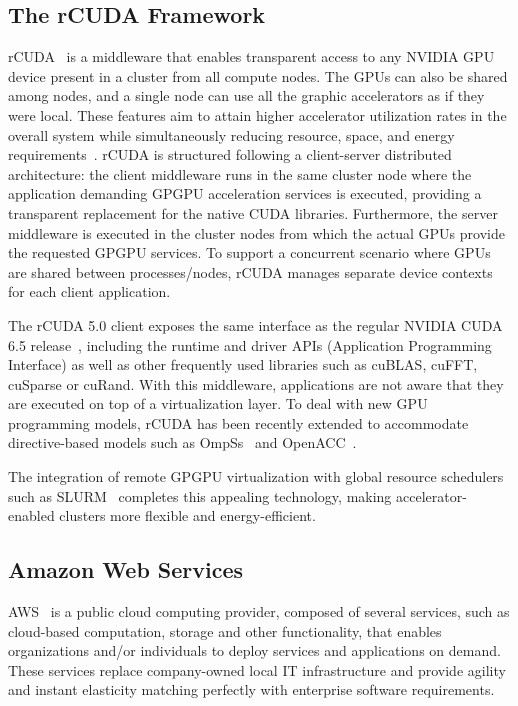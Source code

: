 \documentclass[a4paper,twoside]{article}
\begin{document}
\subsection{The rCUDA Framework}
\label{sec:rcuda}
{rCUDA}~\cite{toniparco} is a middleware that enables transparent access
to any NVIDIA GPU device present in a cluster from all compute
nodes. The GPUs can also be shared among nodes, and a single node can use all the graphic accelerators
as if they were local.
These features aim to attain higher accelerator utilization rates in the overall system while simultaneously reducing
resource, space, and energy requirements~\cite{energy14}.
rCUDA is structured following a client-server distributed
architecture: the client middleware runs in the same cluster node where the application demanding GPGPU
acceleration services is executed, providing a transparent replacement for the
native CUDA libraries. Furthermore, the server middleware is executed in the
cluster nodes from which the actual GPUs provide the requested GPGPU services.
To support a concurrent scenario where GPUs are shared between
processes\slash nodes, {rCUDA} manages separate device contexts for
each client application.

The {rCUDA} 5.0 client exposes the same interface as the regular NVIDIA
CUDA 6.5 release~\cite{cuda65}, including the runtime and driver
APIs (Application Programming Interface) as well as other frequently used libraries such as cuBLAS, cuFFT, cuSparse or cuRand.
With this middleware, applications are not aware that they are executed
on top of a virtualization layer.
To deal with new GPU programming models, {rCUDA} has been recently extended to accommodate 
directive-based models such as OmpSs~\cite{repara15} and OpenACC~\cite{cluster15}.

The integration of remote GPGPU virtualization with global
resource schedulers such as SLURM~\cite{sbacpad14} completes this appealing 
technology, making accelerator-enabled clusters more flexible and
energy-efficient.

\subsection{Amazon Web Services}
\label{sec:aws}
AWS~\cite{aws} is a public cloud computing provider, 
composed of several services, such as 
 cloud-based computation, storage and other functionality, 
that enables organizations and/or individuals to deploy
services and applications on demand. 
These services replace company-owned local IT infrastructure and provide agility and instant elasticity matching 
perfectly with enterprise software requirements.
\end{document}
